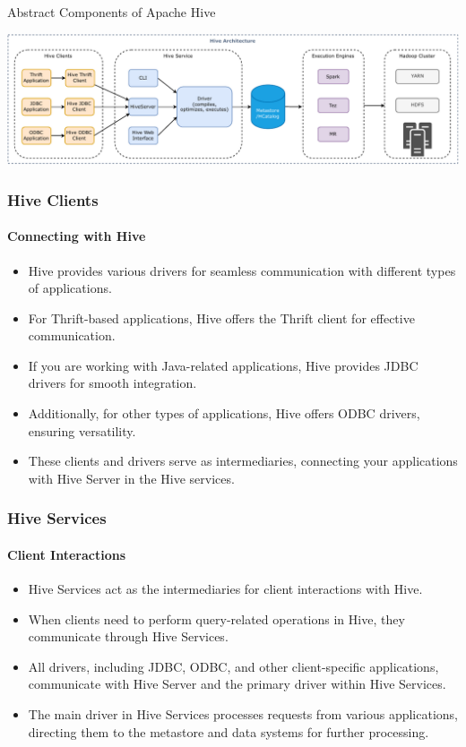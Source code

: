 \begin{frame}{Abstract Components of Apache Hive}

\includegraphics[width=\textwidth,height=\textheight,keepaspectratio]{./Figures/chapter-03/Hive_Architecture.pdf}


\end{frame}
\begin{frame}
\frametitle{Hive Clients}
	\framesubtitle{Connecting with Hive}
	
	\begin{itemize}
	  \item Hive provides various drivers for seamless communication with different types of applications.
	  \item For Thrift-based applications, Hive offers the Thrift client for effective communication.
	  \item If you are working with Java-related applications, Hive provides JDBC drivers for smooth integration.
	  \item Additionally, for other types of applications, Hive offers ODBC drivers, ensuring versatility.
	  \item These clients and drivers serve as intermediaries, connecting your applications with Hive Server in the Hive services.
	\end{itemize}
	
	\end{frame}
\begin{frame}
	\frametitle{Hive Services}
	\framesubtitle{Client Interactions}
	
	\begin{itemize}
	  \item Hive Services act as the intermediaries for client interactions with Hive.
	  \item When clients need to perform query-related operations in Hive, they communicate through Hive Services.
	  \item All drivers, including JDBC, ODBC, and other client-specific applications, communicate with Hive Server and the primary driver within Hive Services.
	  \item The main driver in Hive Services processes requests from various applications, directing them to the metastore and data systems for further processing.
	\end{itemize}
	
	\end{frame}

